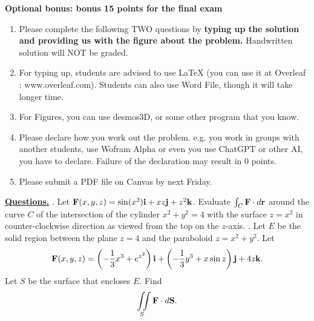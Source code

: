 \setlength{\textwidth}{15.0cm}
\setlength{\textheight}{22.0cm}
\hoffset=-1cm
\pagestyle {plain}
\newtheorem{theorem}{Theorem}[section]
\newtheorem{Def}[theorem]{Definition}
\newtheorem{Prop}[theorem]{Proposition}
\newtheorem{Lem}[theorem]{Lemma}
\newtheorem{Cor}[theorem]{Corollary}
\newtheorem{Rem}[theorem]{Remark}
\newtheorem{Example}[theorem]{Example}
\newtheorem{Coj}[theorem]{Conjecture}
\newtheorem{Main}{Main Theorem}
\renewcommand{\theMain}{}
\topmargin=0cm
\renewcommand{\rm}{\normalshape}
\renewcommand{\baselinestretch}{1.1}

\begin{center}
{\bf Optional bonus: bonus 15 points for the final exam}
\end{center}
\bigskip
\begin{enumerate}
\item Please complete the following TWO questions by {\bf typing up the solution
and providing us with the figure about the problem.} Handwritten solution will NOT
be graded.
\item For typing up, students are advised to use LaTeX (you can use it at
Overleaf : www.overleaf.com). Students can also use Word File, though it will take
longer time.
\item For Figures, you can use desmos3D, or some other program that you know.
\item Please declare how you work out the problem. e.g. you work in groups with
another students, use Wofram Alpha or even you use ChatGPT or other AI, you have to
declare. Failure of the declaration may result in 0 points.
\item Please submit a PDF file on Canvas by next Friday.
\end{enumerate}
\bigskip
\underline{{\bf Questions.}}
. Let ${\bf F}(x,y,z) = \sin (x^2) {\bf i}+ xz {\bf j}+ z^2 {\bf k}$.
Evaluate $\int_C {\bf F}\cdot d{\bf r}$ around the curve $C$ of the intersection
of the cylinder $x^2+y^2=4$ with the surface $z = x^2$ in counter-clockwise
direction as viewed from the top on the $z$-axis.
. Let $E$ be the solid region between the plane $z = 4$ and the paraboloid $z =
x^2+y^2$. Let
$$
{\bf F}(x,y,z) = \left(-\frac13 x^3+e^{z^2}\right){\bf i}+ \left(-\frac13y^3+x\sin
z\right) {\bf j} + 4z{\bf k}.
$$
Let $S$ be the surface that encloses $E$.
Find
$$
\iint\limits_S {\bf F}\cdot d{\bf S}.
$$
\bigskip
\bigskip
